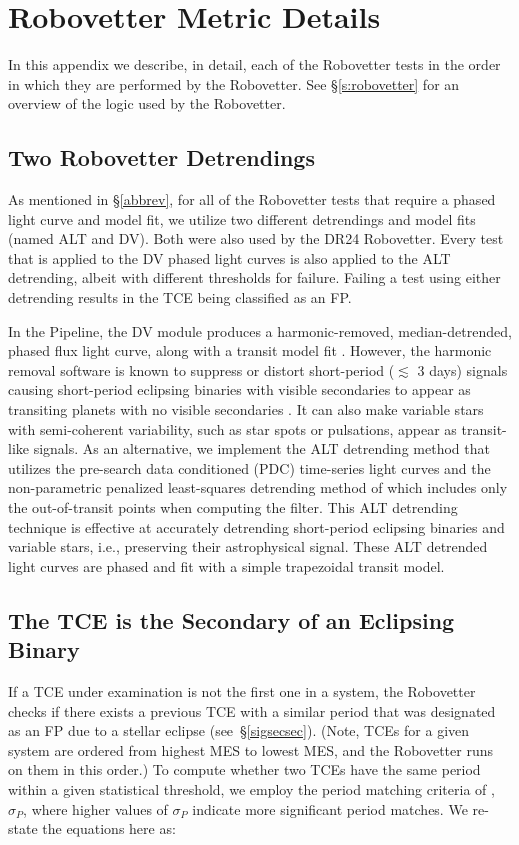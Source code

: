 \section{Robovetter Metric Details}
\label{s:metrics}
In this appendix we describe, in detail, each of the Robovetter tests in the order in which they are performed by the Robovetter. See \S\ref{s:robovetter} for an overview of the logic used by the Robovetter.

\subsection{Two Robovetter Detrendings}
As mentioned in \S\ref{abbrev}, for all of the Robovetter tests that require a phased light curve and model fit, we utilize two different detrendings and model fits (named ALT and DV). Both were also used by the DR24 Robovetter. Every test that is applied to the DV phased light curves is also applied to the ALT detrending, albeit with different thresholds for failure. Failing a test using either detrending results in the TCE being classified as an FP.

In the \kepler{} Pipeline, the DV module produces a harmonic-removed, median-detrended, phased flux light curve, along with a transit model fit \citep{JenkinsKDPH,Wu2010}. However, the harmonic removal software is known to suppress or distort short-period ($\lesssim$ 3 days) signals causing short-period eclipsing binaries with visible secondaries to appear as transiting planets with no visible secondaries \citep{Christiansen2013b}. It can also make variable stars with semi-coherent variability, such as star spots or pulsations, appear as transit-like signals. As an alternative, we implement the ALT detrending method that utilizes the pre-search data conditioned (PDC) time-series light curves and the non-parametric penalized least-squares detrending method of \citet{Garcia2010} which includes only the out-of-transit points when computing the filter. This ALT detrending technique is effective at accurately detrending short-period eclipsing binaries and variable stars, i.e., preserving their astrophysical signal.  These ALT detrended light curves are phased and fit with a simple trapezoidal transit model. 



\subsection{The TCE is the Secondary of an Eclipsing Binary}
\label{s:issecond}
If a TCE under examination is not the first one in a system, the Robovetter checks if there exists a previous TCE with a similar period that was designated as an FP due to a stellar eclipse (see~\S\ref{sigsecsec}). (Note, TCEs for a given system are ordered from highest MES to lowest MES, and the Robovetter runs on them in this order.) To compute whether two TCEs have the same period within a given statistical threshold, we employ the period matching criteria of \citet[][see equations 1-3]{Coughlin2014a}, $\sigma_{P}$, where higher values of $\sigma_{P}$ indicate more significant period matches. We re-state the equations here as:

